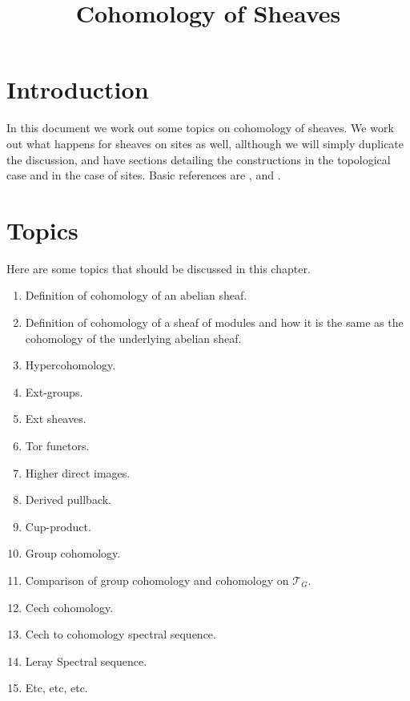 

%


\title{Cohomology of Sheaves}


\maketitle

\tableofcontents

\section{Introduction}
\label{section-introduction}

\noindent
In this document we work out some topics on cohomology of sheaves.
We work out what happens for sheaves on sites
as well, allthough we will simply duplicate the discussion,
and have sections detailing the constructions in the topological
case and in the case of sites.
Basic references are \cite{SGA4}, \cite{Godement} and \cite{Iversen}.

\section{Topics}
\label{section-topics}

\noindent
Here are some topics that should be discussed in this chapter.
\begin{enumerate}
\item Definition of cohomology of an abelian sheaf.
\item Definition of cohomology of a sheaf of modules and
how it is the same as the cohomology of the underlying abelian sheaf.
\item Hypercohomology.
\item Ext-groups.
\item Ext sheaves.
\item Tor functors.
\item Higher direct images.
\item Derived pullback.
\item Cup-product.
\item Group cohomology.
\item Comparison of group cohomology and cohomology on $\mathcal{T}_G$.
\item Cech cohomology.
\item Cech to cohomology spectral sequence.
\item Leray Spectral sequence.
\item Etc, etc, etc.
\end{enumerate}



